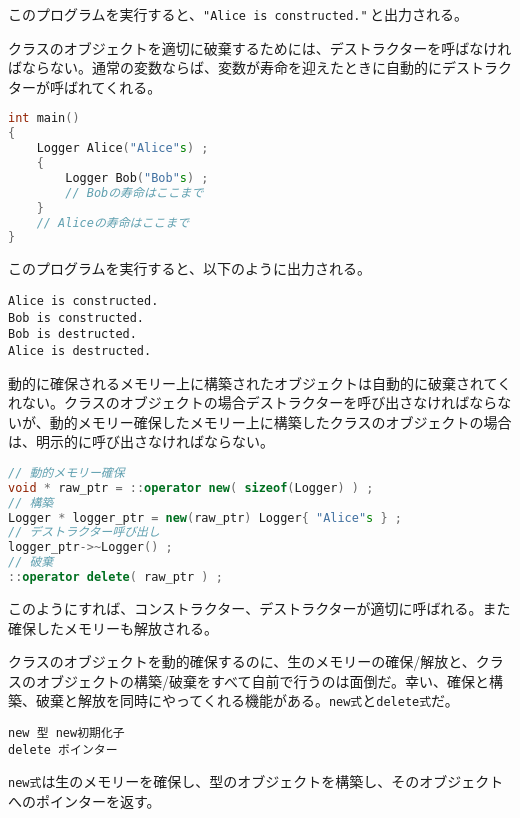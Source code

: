 このプログラムを実行すると、\texttt{"Alice is constructed."}\,と出力される。

クラスのオブジェクトを適切に破棄するためには、デストラクターを呼ばなければならない。通常の変数ならば、変数が寿命を迎えたときに自動的にデストラクターが呼ばれてくれる。

\begin{lstlisting}[language={C++}]
int main()
{
    Logger Alice("Alice"s) ;
    {
        Logger Bob("Bob"s) ;
        // Bobの寿命はここまで
    }
    // Aliceの寿命はここまで
}
\end{lstlisting}

このプログラムを実行すると、以下のように出力される。

\begin{lstlisting}[style=terminal]
Alice is constructed.
Bob is constructed.
Bob is destructed.
Alice is destructed.
\end{lstlisting}

動的に確保されるメモリー上に構築されたオブジェクトは自動的に破棄されてくれない。クラスのオブジェクトの場合デストラクターを呼び出さなければならないが、動的メモリー確保したメモリー上に構築したクラスのオブジェクトの場合は、明示的に呼び出さなければならない。

\ifTombow\pagebreak\fi
\begin{lstlisting}[language={C++}]
// 動的メモリー確保
void * raw_ptr = ::operator new( sizeof(Logger) ) ;
// 構築
Logger * logger_ptr = new(raw_ptr) Logger{ "Alice"s } ;
// デストラクター呼び出し
logger_ptr->~Logger() ;
// 破棄
::operator delete( raw_ptr ) ;
\end{lstlisting}

このようにすれば、コンストラクター、デストラクターが適切に呼ばれる。また確保したメモリーも解放される。


クラスのオブジェクトを動的確保するのに、生のメモリーの確保/解放と、クラスのオブジェクトの構築/破棄をすべて自前で行うのは面倒だ。幸い、確保と構築、破棄と解放を同時にやってくれる機能がある。\texttt{new式}と\texttt{delete式}だ。

\begin{lstlisting}[style=grammar]
new 型 new初期化子
delete ポインター
\end{lstlisting}

\texttt{new式}は生のメモリーを確保し、型のオブジェクトを構築し、そのオブジェクトへのポインターを返す。


